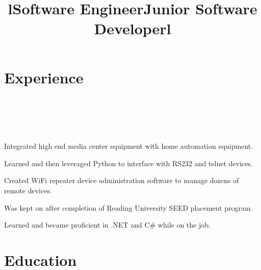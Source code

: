 \documentclass[12pt, tweaklist, line]{res}
\let\tempone\itemize
\let\temptwo\enditemize
\renewenvironment{itemize}{\tempone\vspace{-.15in}\setlength{\topsep}{0pt}\setlength{\itemsep}{3pt}\vspace{-.15in}}{\temptwo}
\begin{document}
\begin{resume}
\section{Experience}
\begin{format}
  \\
  \title{l}\\
  \body\\
\end{format}

\title{Software Engineer}
\begin{position}
\begin{itemize}
\item Integrated high end media center equipment with home automation equipment.
\item Learned and then leveraged Python to interface with RS232 and telnet devices.
\end{itemize}
\end{position}

\title{Junior Software Developer}
\begin{position}
\begin{itemize}
\item Created WiFi repeater device administration software to manage dozens of remote devices.
\item Was kept on after completion of Reading University SEED placement program.
\item Learned and became proficient in .NET and C\# while on the job.
\end{itemize}
\end{position}

\section{Education}
\begin{format}
  \\
  \title{l}\\
  \body\\
\end{format}


\end{resume}
\end{document}
